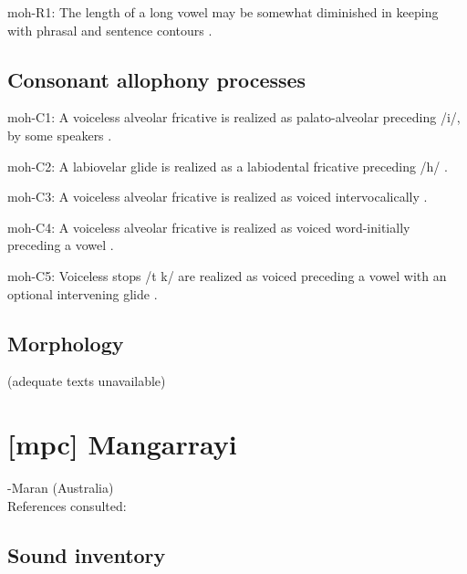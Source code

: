 {\begin{appendixdesc}
\item[moh-R1:] The length of a long vowel may be somewhat diminished in keeping with phrasal and sentence contours \citep[46]{Bonvillain1973}.
\end{appendixdesc}
\subsection*{Consonant allophony processes}
\begin{appendixdesc}

\item[moh-C1:] A voiceless alveolar fricative is realized as palato-alveolar preceding /i/, by some speakers \citep[31]{Bonvillain1973}.

\item[moh-C2:] A labiovelar glide is realized as a labiodental fricative preceding /h/ \citep[34]{Bonvillain1973}.

\item[moh-C3:] A voiceless alveolar fricative is realized as voiced intervocalically \citep{Bonvillain1973}.

\item[moh-C4:] A voiceless alveolar fricative is realized as voiced word-initially preceding a vowel \citep{Bonvillain1973}.

\item[moh-C5:] Voiceless stops /t k/ are realized as voiced preceding a vowel with an optional intervening glide \citep[28]{Bonvillain1973}.
\end{appendixdesc}
\subsection*{Morphology}

(adequate texts unavailable)

\section*{[mpc] Mangarrayi} %
-Maran (Australia)\medskip\\
References consulted: \citet{Merlan1989}

\subsection*{Sound inventory}
\begin{appendixdesc}


\end{appendixdesc}}

